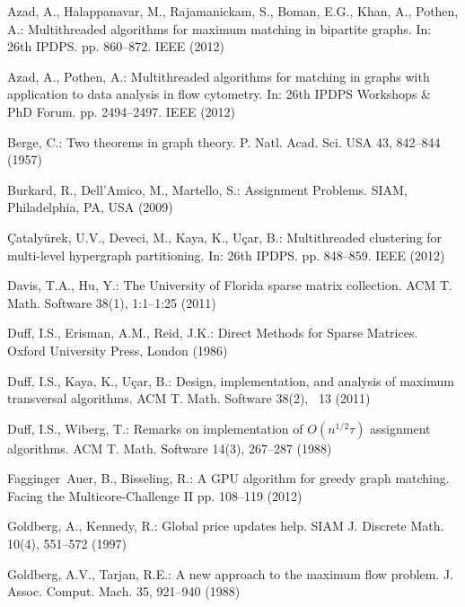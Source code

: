 \documentclass[11pt,a4paper]{article}
\begin{document}
\vspace*{-2ex}

\begin{thebibliography}{10}
\vspace*{-2ex}
\providecommand{\url}[1]{\texttt{#1}}
\providecommand{\urlprefix}{URL }

Azad, A., Halappanavar, M., Rajamanickam, S., Boman, E.G., Khan, A., Pothen,
  A.: Multithreaded algorithms for maximum matching in bipartite graphs. In:
  26th IPDPS. pp. 860--872. IEEE (2012)

Azad, A., Pothen, A.: Multithreaded algorithms for matching in graphs with
  application to data analysis in flow cytometry. In: 26th IPDPS Workshops \&
  PhD Forum. pp. 2494--2497. IEEE (2012)

Berge, C.: Two theorems in graph theory. P. Natl. Acad. Sci. USA  43,  842--844
  (1957)

Burkard, R., Dell'Amico, M., Martello, S.: Assignment Problems. SIAM,
  Philadelphia, PA, USA (2009)

\c{C}ataly\"{u}rek, U.V., Deveci, M., Kaya, K., U\c{c}ar, B.: Multithreaded
  clustering for multi-level hypergraph partitioning. In: 26th IPDPS. pp.
  848--859. IEEE (2012)

Davis, T.A., Hu, Y.: The {U}niversity of {F}lorida sparse matrix collection.
  ACM T. Math. Software  38(1),  1:1--1:25 (2011)

Duff, I.S., Erisman, A.M., Reid, J.K.: Direct Methods for Sparse Matrices.
  Oxford University Press, London (1986)

Duff, I.S., Kaya, K., U{\c{c}}ar, B.: Design, implementation, and analysis of
  maximum transversal algorithms. ACM T. Math. Software  38(2), ~13 (2011)

Duff, I.S., Wiberg, T.: Remarks on implementation of {$O(n^{1/2}\tau)$}
  assignment algorithms. ACM T. Math. Software  14(3),  267--287 (1988)

Fagginger~Auer, B., Bisseling, R.: A {GPU} algorithm for greedy graph matching.
  Facing the Multicore-Challenge II pp. 108--119 (2012)

Goldberg, A., Kennedy, R.: Global price updates help. SIAM J. Discrete Math.
  10(4),  551--572 (1997)

Goldberg, A.V., Tarjan, R.E.: A new approach to the maximum flow problem. J.
  Assoc. Comput. Mach.  35,  921--940 (1988)


\end{thebibliography}
\end{document}
